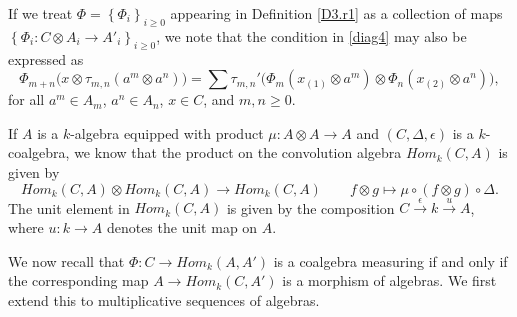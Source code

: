 \documentclass[10pt, colorlinks]{article}
\numberwithin{equation}{section} \DeclareMathSizes{2}{10}{12}{13}
\begin{document}
If we treat $\Phi=\left\{\Phi_i\right\}_{i\geq 0}$ appearing in Definition \ref{D3.r1} as a collection of maps $\left\{\Phi_i:C\otimes A_i\longrightarrow A'_i\right\}_{i\geq 0}$, we note that the condition in \eqref{diag4} may also be expressed as
    \begin{equation}\label{diag4prm}
        \Phi_{m+n}\big(x\otimes\tau_{m,n}(a^m\otimes a^n)\big)=\sum \tau_{m,n}'\Big(\Phi_m(x_{(1)}\otimes a^m)\otimes\Phi_n(x_{(2)}\otimes a^n)\Big),
    \end{equation}
    for all  $a^m\in A_m$, $a^n\in A_n$, $x\in C$, and  $m,n\geq 0$.  

    \smallskip
    If $A$ is a $k$-algebra equipped with product $\mu:A\otimes A\longrightarrow A$ and $(C,\Delta,\epsilon)$ is a $k$-coalgebra, we know that the product on the convolution algebra $Hom_k(C,A)$ is given by
     \begin{equation}\label{con3.2}
        {Hom}_k(C,A)\otimes {Hom}_k(C,A)\longrightarrow  {Hom}_k(C,A)\qquad f\otimes g\longmapsto \mu\circ(f\otimes g)\circ\Delta.
     \end{equation} The unit element in $Hom_k(C,A)$ is given by the composition $C\xrightarrow{\epsilon}k\xrightarrow{u}A$, where $u:k\longrightarrow A$ denotes the unit map
     on $A$. 
     
     \smallskip
     We now recall that $\Phi:C\longrightarrow Hom_k(A,A')$ is a coalgebra measuring if and only if the corresponding map $A\longrightarrow Hom_k(C,A')$ is a morphism of algebras. We first extend this to multiplicative sequences of algebras. 
     
\end{document}
